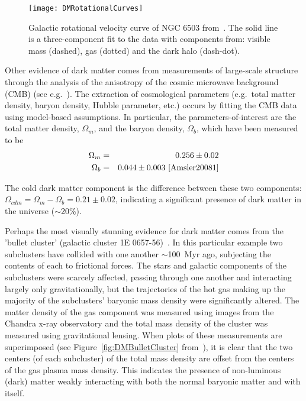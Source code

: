 		\begin{figure}
			\centering
			\texttt{[image: DMRotationalCurves]}
			\caption[Galactic rotational velocity curve of NGC 6503.]{Galactic rotational velocity curve of NGC 6503
			from~\cite{Begeman:1991iy}.  The solid line is a three-component fit to the data with components from:
			visible mass (dashed), gas (dotted) and the dark halo (dash-dot).  }
			\label{fig:DMRotCurve}
		\end{figure}
	Other evidence of dark matter comes from measurements of large-scale structure through the analysis of the anisotropy of the cosmic microwave background (CMB) (see e.g.~\cite{Amsler20081}).  The extraction of cosmological parameters (e.g.~total matter density, baryon density, Hubble parameter, etc.) occurs by fitting the CMB data using model-based assumptions.  In particular, the parameters-of-interest are the total matter density, $\Omega_{m}$, and the baryon density, $\Omega_{b}$, which have been measured to be
		\begin{eqnarray*}
			\Omega_{m} & = & 0.256 \pm 0.02 \\
			\Omega_{b} & = & 0.044 \pm 0.003~\cite{Amsler20081}
		\end{eqnarray*}

The cold dark matter component is the difference between these two components: $\Omega_{cdm} = \Omega_{m} - \Omega_{b} = 0.21 \pm 0.02$, indicating a significant presence of dark matter in the universe ($\sim$20\%).

	
	Perhaps the most visually stunning evidence for dark matter comes from the 'bullet cluster' (galactic cluster 1E 0657-56)~\cite{Clowe06}.  In this particular example two subclusters have collided with one another $\sim$100~Myr ago, subjecting the contents of each to frictional forces.  The stars and galactic components of the subclusters were scarcely affected, passing through one another and interacting largely only gravitationally, but the trajectories of the hot gas making up the majority of the subclusters' baryonic mass density were significantly altered.  The matter density of the gas component was measured using images from the Chandra x-ray observatory and the total mass density of the cluster was measured using gravitational lensing.  When plots of these measurements are superimposed (see Figure~\ref{fig:DMBulletCluster} from~\cite{Clowe06}), it is clear that the two centers (of each subcluster) of the total mass density are offset from the centers of the gas plasma mass density.  This indicates the presence of non-luminous (dark) matter weakly interacting with both the normal baryonic matter and with itself.  
	
